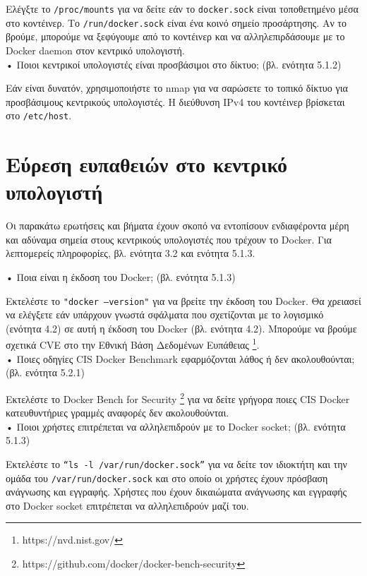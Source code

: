 Ελέγξτε το \texttt{\textlatin{/proc/mounts}} για να δείτε εάν το
\texttt{\textlatin{docker.sock}} είναι τοποθετημένο μέσα στο κοντέινερ.
Το \texttt{\textlatin{/run/docker.sock}} είναι ένα κοινό σημείο προσάρτησης. Αν
το βρούμε, μπορούμε να ξεφύγουμε από το κοντέινερ και να αλληλεπιρδάσουμε με το
\textlatin{Docker daemon} στον κεντρικό υπολογιστή. \\


• Ποιοι κεντρικοί υπολογιστές είναι προσβάσιμοι στο δίκτυο; (βλ. ενότητα 5.1.2)

Εάν είναι δυνατόν, χρησιμοποιήστε το \textlatin{nmap} για να σαρώσετε το τοπικό
δίκτυο για προσβάσιμους κεντρικούς υπολογιστές. Η διεύθυνση \textlatin{IPv4} του
κοντέινερ βρίσκεται στο \texttt{\textlatin{/etc/host}}. \\


\section{Εύρεση ευπαθειών στο κεντρικό υπολογιστή}

Οι παρακάτω ερωτήσεις και βήματα έχουν σκοπό να εντοπίσουν ενδιαφέροντα μέρη
και αδύναμα σημεία στους κεντρικούς υπολογιστές που τρέχουν το
\textlatin{Docker}. Για λεπτομερείς πληροφορίες, βλ. ενότητα 3.2 και ενότητα
5.1.3.


• Ποια είναι η έκδοση του \textlatin{Docker}; (βλ. ενότητα 5.1.3)

Εκτελέστε το \texttt{\textlatin{"docker --version"}} για να βρείτε την έκδοση
του \textlatin{Docker}. Θα χρειασεί να ελέγξετε εάν υπάρχουν γνωστά σφάλματα που
σχετίζονται με το λογισμικό (ενότητα 4.2) σε αυτή η έκδοση του
\textlatin{Docker} (βλ. ενότητα 4.2). Μπορούμε να βρούμε σχετικά \textlatin{CVE}
στο την Εθνική Βάση Δεδομένων Ευπάθειας
\footnote{\textlatin{https://nvd.nist.gov/}}. \\

• Ποιες οδηγίες \textlatin{CIS Docker Benchmark} εφαρμόζονται λάθος ή δεν
ακολουθούνται; (βλ. ενότητα 5.2.1)

Εκτελέστε το \textlatin{Docker Bench for Security}
\footnote{\textlatin{https://github.com/docker/docker-bench-security}}
για να δείτε γρήγορα ποιες \textlatin{CIS Docker} κατευθυντήριες γραμμές
αναφορές δεν ακολουθούνται. \\


• Ποιοι χρήστες επιτρέπεται να αλληλεπιδρούν με το \textlatin{Docker socket};
(βλ. ενότητα 5.1.3)

Εκτελέστε το \texttt{\textlatin{“ls -l /var/run/docker.sock”}} για να δείτε τον
ιδιοκτήτη και την ομάδα του \texttt{\textlatin{/var/run/docker.sock}} και στο
οποίο οι χρήστες έχουν πρόσβαση ανάγνωσης και εγγραφής. Χρήστες που έχουν
δικαιώματα ανάγνωσης και εγγραφής στο \textlatin{Docker socket} επιτρέπεται να
αλληλεπιδρούν μαζί του. \\

